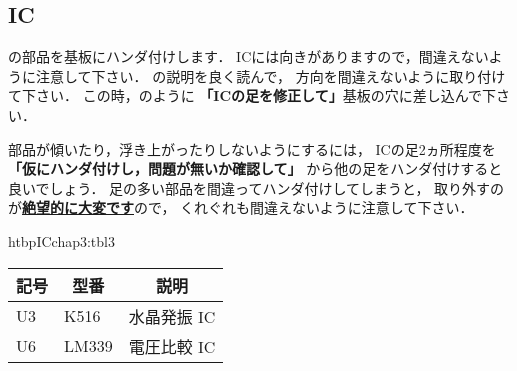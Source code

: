 
%
%

\newpage
\subsection{IC}
の部品を基板にハンダ付けします．
ICには向きがありますので，間違えないように注意して下さい．
の説明を良く読んで，
方向を間違えないように取り付けて下さい．
この時，のように
{\bf 「ICの足を修正して」}基板の穴に差し込んで下さい．

部品が傾いたり，浮き上がったりしないようにするには，
ICの足2ヵ所程度を{\bf 「仮にハンダ付けし，問題が無いか確認して」}
から他の足をハンダ付けすると良いでしょう．
足の多い部品を間違ってハンダ付けしてしまうと，
取り外すのが\underline{\bf 絶望的に大変です}ので，
くれぐれも間違えないように注意して下さい．

\begin{mytable}{htbp}{IC}{chap3:tbl3}
\begin{tabular}{|l|l|l|}
\hline
\multicolumn{1}{|c|}{記号} &
\multicolumn{1}{c|}{型番} &
\multicolumn{1}{c|}{説明} \\
\hline
U3 & K516       & 水晶発振 IC \\
U6 & LM339      & 電圧比較 IC \\
\hline
\end{tabular}
\end{mytable}


